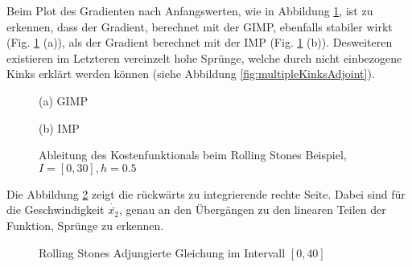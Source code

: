 Beim Plot des Gradienten nach Anfangswerten, wie in Abbildung \ref{fig:rollingGrad}, ist zu erkennen, dass der Gradient, berechnet mit der GIMP, ebenfalls stabiler wirkt (Fig. \ref{fig:rollingGrad} (a)), als der Gradient berechnet mit der IMP (Fig. \ref{fig:rollingGrad} (b)). Desweiteren existieren im Letzteren vereinzelt hohe Sprünge, welche durch nicht einbezogene Kinks erklärt werden können (siehe Abbildung \ref{fig:multipleKinksAdjoint}). 
\begin{figure}[H]
\footnotesize 
\centering
\begin{minipage}[b]{0.49\linewidth}

\end{minipage}
\begin{minipage}[b]{0.49\linewidth}

\end{minipage}
\begin{minipage}[b]{0.49\linewidth}

\caption*{(a) GIMP}
\end{minipage}
\begin{minipage}[b]{0.49\linewidth}

\caption*{(b) IMP}
\end{minipage}
\caption{Ableitung des Kostenfunktionals beim Rolling Stones Beispiel, $I = [0,30],h=0.5$}
\label{fig:rollingGrad}
\end{figure}

Die Abbildung \ref{fig:rolling_adjoint_eq} zeigt die rückwärts zu integrierende rechte Seite. Dabei sind für die Geschwindigkeit $\dot{\bar{x_2}}$, genau an den Übergängen zu den linearen Teilen der Funktion, Sprünge zu erkennen.
\begin{figure}[H]
\centering

\caption{Rolling Stones Adjungierte Gleichung im Intervall $[0,40]$}
\label{fig:rolling_adjoint_eq}
\end{figure}


